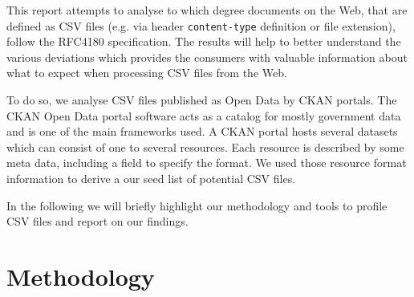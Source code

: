 \documentclass{scrartcl}
\begin{document}
This report attempts to analyse to which degree documents on the Web, that are defined as CSV files (e.g. via header \texttt{content-type} definition or file extension), follow the RFC4180 specification.
The results will help to better understand the various deviations which provides the consumers with valuable information about what to expect when processing CSV files from the Web. 

To do so, we analyse CSV files published as Open Data by CKAN portals. 
The CKAN Open Data portal software acts as a catalog for mostly government data and is one of the main frameworks used. 
A CKAN portal hosts several datasets which can consist of one to several resources. Each resource is described by some meta data, including a field to specify the format. 
We used those resource format information to derive a our seed list of potential CSV files. 

In the following we will briefly highlight our methodology and tools to profile CSV files and report on our findings. 

\section{Methodology}
\end{document}
